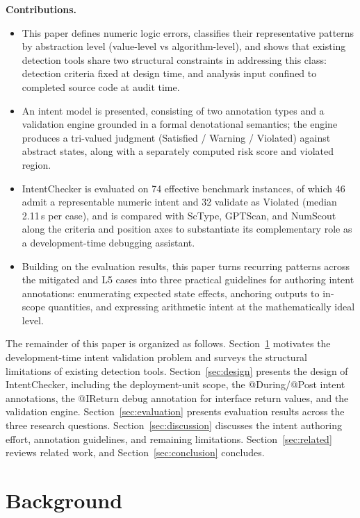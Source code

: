 \documentclass[pdflatex,sn-basic]{sn-jnl}%
\theoremstyle{thmstyleone}%
\theoremstyle{thmstyletwo}%
\theoremstyle{thmstylethree}%
\begin{document}
\smallskip
\noindent\textbf{Contributions.}
\begin{itemize}
    \item This paper defines numeric logic errors, classifies their representative patterns by abstraction level (value-level vs algorithm-level), and shows that existing detection tools share two structural constraints in addressing this class: detection criteria fixed at design time, and analysis input confined to completed source code at audit time.
    \item An intent model is presented, consisting of two annotation types and a validation engine grounded in a formal denotational semantics; the engine produces a tri-valued judgment (Satisfied / Warning / Violated) against abstract states, along with a separately computed risk score and violated region.
    \item IntentChecker is evaluated on 74 effective benchmark instances, of which 46 admit a representable numeric intent and 32 validate as Violated (median 2.11\,s per case), and is compared with ScType, GPTScan, and NumScout along the criteria and position axes to substantiate its complementary role as a development-time debugging assistant.
    \item Building on the evaluation results, this paper turns recurring patterns across the mitigated and L5 cases into three practical guidelines for authoring intent annotations: enumerating expected state effects, anchoring outputs to in-scope quantities, and expressing arithmetic intent at the mathematically ideal level.
\end{itemize}

The remainder of this paper is organized as follows.
Section~\ref{sec:background} motivates the development-time intent validation problem and surveys the structural limitations of existing detection tools.
Section~\ref{sec:design} presents the design of IntentChecker, including the deployment-unit scope, the @During/@Post intent annotations, the @IReturn debug annotation for interface return values, and the validation engine.
Section~\ref{sec:evaluation} presents evaluation results across the three research questions.
Section~\ref{sec:discussion} discusses the intent authoring effort, annotation guidelines, and remaining limitations.
Section~\ref{sec:related} reviews related work, and Section~\ref{sec:conclusion} concludes.

\section{Background}\label{sec:background}
\end{document}
